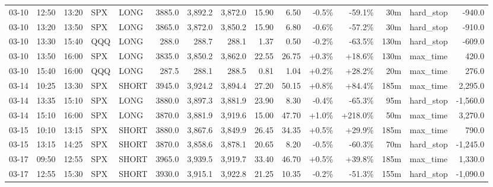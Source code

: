 \documentclass[11pt,a4paper,twoside]{article}
\begin{document}
\begin{landscape}
\begin{center}
\begin{longtable}{>{\color{txtmain}}l l l l l r r r r r r r r >{\color{txtmain}}l r}
03-10 & 12:50 & 13:20 & SPX & LONG & 3885.0 & 3,892.2 & 3,872.0 & 15.90 & 6.50 & \textcolor{lossred}{-0.5\%} & \textcolor{lossred}{-59.1\%} & 30m & hard\_stop & \textcolor{lossred}{-940.0} \\
03-10 & 13:20 & 13:50 & SPX & LONG & 3865.0 & 3,872.0 & 3,850.2 & 15.90 & 6.80 & \textcolor{lossred}{-0.6\%} & \textcolor{lossred}{-57.2\%} & 30m & hard\_stop & \textcolor{lossred}{-910.0} \\
03-10 & 13:30 & 15:40 & QQQ & LONG & 288.0 & 288.7 & 288.1 & 1.37 & 0.50 & \textcolor{lossred}{-0.2\%} & \textcolor{lossred}{-63.5\%} & 130m & hard\_stop & \textcolor{lossred}{-609.0} \\
03-10 & 13:50 & 16:00 & SPX & LONG & 3835.0 & 3,850.2 & 3,862.0 & 22.55 & 26.75 & \textcolor{wingreen}{+0.3\%} & \textcolor{wingreen}{+18.6\%} & 130m & max\_time & \textcolor{wingreen}{420.0} \\
03-10 & 15:40 & 16:00 & QQQ & LONG & 287.5 & 288.1 & 288.5 & 0.81 & 1.04 & \textcolor{wingreen}{+0.2\%} & \textcolor{wingreen}{+28.2\%} & 20m & max\_time & \textcolor{wingreen}{276.0} \\
03-14 & 10:25 & 13:30 & SPX & SHORT & 3945.0 & 3,924.2 & 3,894.4 & 27.20 & 50.15 & \textcolor{wingreen}{+0.8\%} & \textcolor{wingreen}{+84.4\%} & 185m & max\_time & \textcolor{wingreen}{2,295.0} \\
03-14 & 13:35 & 15:10 & SPX & LONG & 3880.0 & 3,897.3 & 3,881.9 & 23.90 & 8.30 & \textcolor{lossred}{-0.4\%} & \textcolor{lossred}{-65.3\%} & 95m & hard\_stop & \textcolor{lossred}{-1,560.0} \\
03-14 & 15:10 & 16:00 & SPX & LONG & 3870.0 & 3,881.9 & 3,919.6 & 15.00 & 47.70 & \textcolor{wingreen}{+1.0\%} & \textcolor{wingreen}{+218.0\%} & 50m & max\_time & \textcolor{wingreen}{3,270.0} \\
03-15 & 10:10 & 13:15 & SPX & SHORT & 3880.0 & 3,867.6 & 3,849.9 & 26.45 & 34.35 & \textcolor{wingreen}{+0.5\%} & \textcolor{wingreen}{+29.9\%} & 185m & max\_time & \textcolor{wingreen}{790.0} \\
03-15 & 13:15 & 14:25 & SPX & SHORT & 3870.0 & 3,858.6 & 3,878.1 & 20.65 & 8.20 & \textcolor{lossred}{-0.5\%} & \textcolor{lossred}{-60.3\%} & 70m & hard\_stop & \textcolor{lossred}{-1,245.0} \\
03-17 & 09:50 & 12:55 & SPX & SHORT & 3965.0 & 3,939.5 & 3,919.7 & 33.40 & 46.70 & \textcolor{wingreen}{+0.5\%} & \textcolor{wingreen}{+39.8\%} & 185m & max\_time & \textcolor{wingreen}{1,330.0} \\
03-17 & 12:55 & 15:30 & SPX & SHORT & 3930.0 & 3,915.1 & 3,922.8 & 21.25 & 10.35 & \textcolor{lossred}{-0.2\%} & \textcolor{lossred}{-51.3\%} & 155m & hard\_stop & \textcolor{lossred}{-1,090.0} \\

\end{longtable}
\end{center}
\end{landscape}
\end{document}
